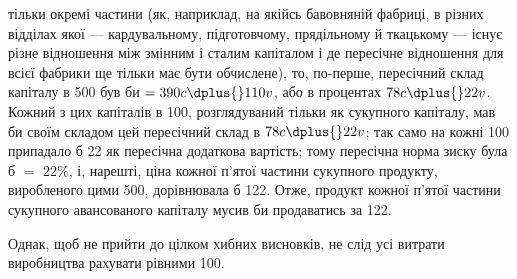 \parcont{}  %
тільки окремі частини (як, наприклад, на якійсь бавовняній фабриці, в різних відділах якої —
кардувальному, підготовчому, прядільному й ткацькому — існує різне відношення між змінним і
сталим капіталом і де пересічне відношення для всієї фабрики
ще тільки має бути обчислене), то, по-перше, пересічний склад
капіталу в 500 був би $= 390 c \dplus{} 110 v$, або в процентах $78 c \dplus{} 22 v$.
Кожний з цих капіталів в 100, розглядуваний тільки як  сукупного капіталу, мав би своїм складом цей
пересічний склад
в $78 c \dplus{} 22 v$; так само на кожні 100 припадало б 22 як пересічна
додаткова вартість; тому пересічна норма зиску була б $=$ 22\%,
і, нарешті, ціна кожної п’ятої частини сукупного продукту, виробленого цими 500, дорівнювала б 122.
Отже, продукт кожної
п’ятої частини сукупного авансованого капіталу мусив би продаватись за 122.

Однак, щоб не прийти до цілком хибних висновків, не слід
усі витрати виробництва рахувати рівними 100.

